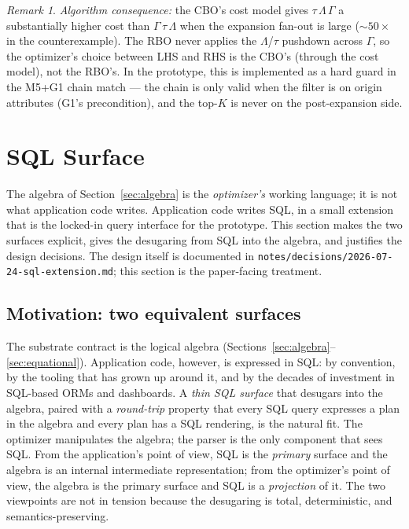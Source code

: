 \documentclass[sigconf,nonacm,review]{acmart}
\theoremstyle{plain}
\theoremstyle{definition}
\theoremstyle{remark}
\newtheorem{remark}{Remark}
\begin{document}
\begin{remark}
\emph{Algorithm consequence:} the CBO's cost model gives
$\tau\, \Lambda\, \Gamma$ a substantially higher cost than
$\Gamma\, \tau\, \Lambda$ when the expansion fan-out is large
($\sim 50\times$ in the counterexample). The RBO never
applies the $\Lambda$/$\tau$ pushdown across $\Gamma$, so the
optimizer's choice between LHS and RHS is the CBO's
(through the cost model), not the RBO's. In the prototype,
this is implemented as a hard guard in the M5+G1 chain
match --- the chain is only valid when the filter is on
origin attributes (G1's precondition), and the top-$K$ is
never on the post-expansion side.
\end{remark}

\section{SQL Surface}\label{sec:sql}

The algebra of Section~\ref{sec:algebra} is the \emph{optimizer's}
working language; it is not what application code writes.
Application code writes SQL, in a small extension that is the
locked-in query interface for the prototype. This section makes
the two surfaces explicit, gives the desugaring from SQL into
the algebra, and justifies the design decisions. The design
itself is documented in
\texttt{notes/decisions/2026-07-24-sql-extension.md}; this
section is the paper-facing treatment.

\subsection{Motivation: two equivalent surfaces}\label{sec:sql:motivation}

The substrate contract is the logical algebra
(Sections~\ref{sec:algebra}--\ref{sec:equational}). Application
code, however, is expressed in SQL: by convention, by the
tooling that has grown up around it, and by the decades of
investment in SQL-based ORMs and dashboards. A \emph{thin SQL
surface} that desugars into the algebra, paired with a
\emph{round-trip} property that every SQL query expresses a plan
in the algebra and every plan has a SQL rendering, is the
natural fit. The optimizer manipulates the algebra; the
parser is the only component that sees SQL. From the
application's point of view, SQL is the \emph{primary} surface and the
algebra is an internal intermediate representation; from the
optimizer's point of view, the algebra is the primary surface
and SQL is a \emph{projection} of it. The two viewpoints are not
in tension because the desugaring is total, deterministic, and
semantics-preserving.
\end{document}
